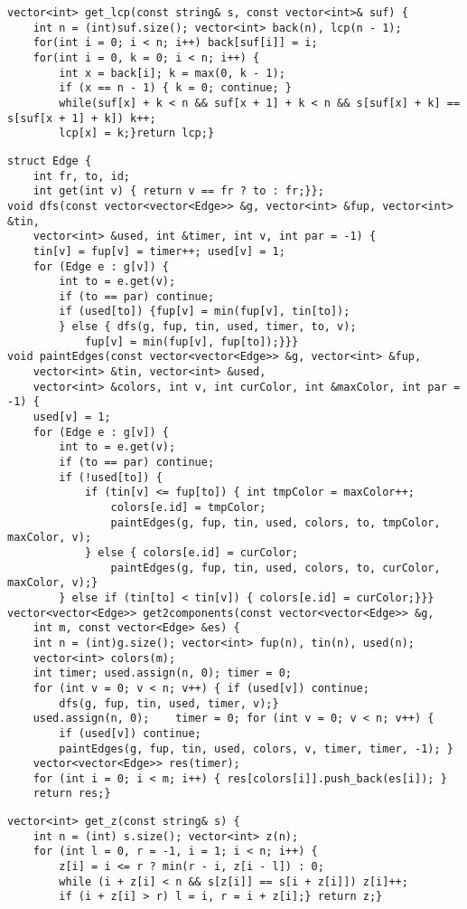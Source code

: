 \documentclass[12pt]{article}
\begin{document}
\begin{verbatim}
vector<int> get_lcp(const string& s, const vector<int>& suf) {
    int n = (int)suf.size(); vector<int> back(n), lcp(n - 1);
    for(int i = 0; i < n; i++) back[suf[i]] = i;
    for(int i = 0, k = 0; i < n; i++) {
        int x = back[i]; k = max(0, k - 1);
        if (x == n - 1) { k = 0; continue; }
        while(suf[x] + k < n && suf[x + 1] + k < n && s[suf[x] + k] == s[suf[x + 1] + k]) k++;
        lcp[x] = k;}return lcp;}
\end{verbatim}

\begin{verbatim}
struct Edge {
    int fr, to, id;
    int get(int v) { return v == fr ? to : fr;}};
void dfs(const vector<vector<Edge>> &g, vector<int> &fup, vector<int> &tin, 
    vector<int> &used, int &timer, int v, int par = -1) {
    tin[v] = fup[v] = timer++; used[v] = 1;
    for (Edge e : g[v]) {
        int to = e.get(v);
        if (to == par) continue;
        if (used[to]) {fup[v] = min(fup[v], tin[to]);
        } else { dfs(g, fup, tin, used, timer, to, v);
            fup[v] = min(fup[v], fup[to]);}}}
void paintEdges(const vector<vector<Edge>> &g, vector<int> &fup, 
    vector<int> &tin, vector<int> &used,
    vector<int> &colors, int v, int curColor, int &maxColor, int par = -1) {
    used[v] = 1;
    for (Edge e : g[v]) {
        int to = e.get(v);
        if (to == par) continue;
        if (!used[to]) {
            if (tin[v] <= fup[to]) { int tmpColor = maxColor++;
                colors[e.id] = tmpColor;
                paintEdges(g, fup, tin, used, colors, to, tmpColor, maxColor, v);
            } else { colors[e.id] = curColor;
                paintEdges(g, fup, tin, used, colors, to, curColor, maxColor, v);}
        } else if (tin[to] < tin[v]) { colors[e.id] = curColor;}}}
vector<vector<Edge>> get2components(const vector<vector<Edge>> &g, 
    int m, const vector<Edge> &es) {
    int n = (int)g.size(); vector<int> fup(n), tin(n), used(n); 
    vector<int> colors(m);
    int timer; used.assign(n, 0); timer = 0;
    for (int v = 0; v < n; v++) { if (used[v]) continue;
        dfs(g, fup, tin, used, timer, v);}
    used.assign(n, 0);    timer = 0; for (int v = 0; v < n; v++) {
        if (used[v]) continue;
        paintEdges(g, fup, tin, used, colors, v, timer, timer, -1); }
    vector<vector<Edge>> res(timer);
    for (int i = 0; i < m; i++) { res[colors[i]].push_back(es[i]); }
    return res;}
\end{verbatim}

\begin{verbatim}
vector<int> get_z(const string& s) {
    int n = (int) s.size(); vector<int> z(n);
    for (int l = 0, r = -1, i = 1; i < n; i++) {
        z[i] = i <= r ? min(r - i, z[i - l]) : 0;
        while (i + z[i] < n && s[z[i]] == s[i + z[i]]) z[i]++;
        if (i + z[i] > r) l = i, r = i + z[i];} return z;}
\end{verbatim}
\end{document}

